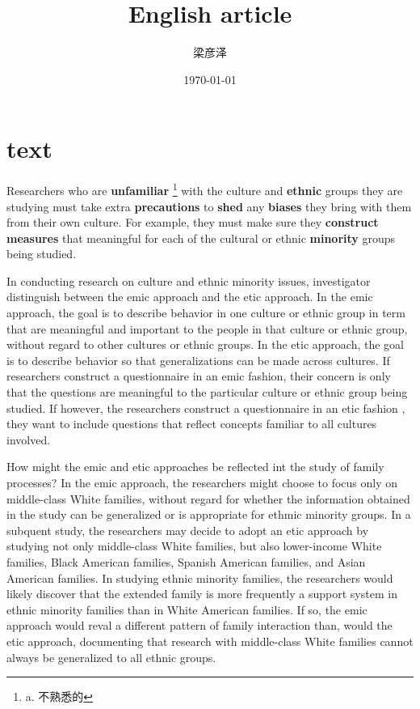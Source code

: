 \documentclass[UTF8]{ctexart}
\title{English article}
\author{梁彦泽}
\date{\today}
\newcommand\Emph{\textbf}
\begin{document}
\maketitle
\tableofcontents
\newpage

\section{text}
Researchers who are \Emph{unfamiliar} \footnote{a. 不熟悉的} with the culture and \Emph{ethnic} groups they are studying
must take extra \Emph{precautions} to \Emph{shed} any \Emph{biases} they bring with them from their own culture. For example,
they must make sure they \Emph{construct measures} that meaningful for each of the cultural or ethnic \Emph{minority} groups being studied.


In conducting research on culture and ethnic minority issues, investigator distinguish between the emic approach and the 
etic approach. In the emic approach, the goal is to describe behavior in one culture or ethnic group in term that are meaningful
and important to the people in that culture or ethnic group, without regard to other cultures or ethnic groups. In the etic approach, the goal is to
describe behavior so that generalizations can be made across cultures. If researchers construct a questionnaire in an emic fashion, their concern is only that the 
questions are meaningful to the particular culture or ethnic group being studied. If however, the researchers construct a questionnaire in an etic fashion , they
want to include questions that reflect concepts familiar to all cultures involved.

How might the emic and etic approaches be reflected int the study of family processes? In the emic approach, the researchers might choose to focus only on middle-class
White families, without regard for whether the information obtained in the study can be generalized or is appropriate for ethmic minority groups. In a subquent study,
the researchers may decide to adopt an etic approach by studying not only middle-class White families, but also lower-income White families, Black American families,
Spanish American families, and Asian American families. In studying ethnic minority families, the researchers would likely discover that the extended family is more 
frequently a support system in ethnic minority families than in White American families. If so, the emic approach would reval a different pattern of family interaction
than, would the etic approach, documenting that research with middle-class White families cannot always be generalized to all ethnic groups.
\end{document}
